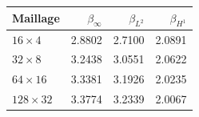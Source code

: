 \begin{tabular}{lrrr}
\toprule
Maillage & \(\beta_\infty\) & \(\beta_{L^2}\) & \(\beta_{H^1}\) \\
\midrule
\(16\times4\) & 2.8802 & 2.7100 & 2.0891 \\
\(32\times8\) & 3.2438 & 3.0551 & 2.0622 \\
\(64\times16\) & 3.3381 & 3.1926 & 2.0235 \\
\(128\times32\) & 3.3774 & 3.2339 & 2.0067 \\
\bottomrule
\end{tabular}
